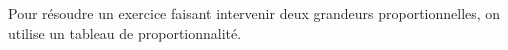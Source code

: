 Pour résoudre un exercice faisant intervenir deux grandeurs proportionnelles,
on utilise un tableau de proportionnalité.